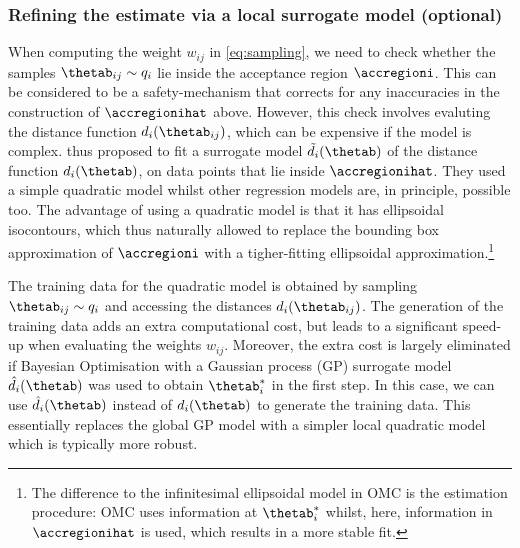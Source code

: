 \subsubsection*{Refining the estimate via a local surrogate model (optional)}
When computing the weight \(w_{ij}\) in \eqref{eq:sampling}, we need
to check whether the samples \(\thetab_{ij} \sim q_i\) lie inside the
acceptance region \(\accregioni\). This can be considered to be a
safety-mechanism that corrects for any inaccuracies in the
construction of \(\accregionihat\) above. However, this check involves
evaluting the distance function \(d_i(\thetab_{ij})\), which can be
expensive if the model is complex. \citet{Ikonomov2019} thus proposed
to fit a surrogate model \(\tilde{d}_i(\thetab)\) of the distance
function \(d_i(\thetab)\), on data points that lie inside
\(\accregionihat\). They used a simple quadratic model whilst other
regression models are, in principle, possible too. The advantage of
using a quadratic model is that it has ellipsoidal isocontours, which
thus naturally allowed \citet{Ikonomov2019} to replace the bounding
box approximation of \(\accregioni\) with a tigher-fitting ellipsoidal
approximation.\footnote{The difference to the infinitesimal
  ellipsoidal model in OMC is the estimation procedure: OMC uses
  information at \(\thetab_i^*\) whilst, here, information in
  \(\accregionihat\) is used, which results in a more stable fit.}

The training data for the quadratic model is obtained by sampling
\(\thetab_{ij} \sim q_i\) and accessing the distances
\(d_i(\thetab_{ij})\). The generation of the training data adds an
extra computational cost, but leads to a significant speed-up when
evaluating the weights \(w_{ij}\). Moreover, the extra cost is largely
eliminated if Bayesian Optimisation with a Gaussian process (GP)
surrogate model \(\hat{d}_i(\thetab)\) was used to obtain
\(\thetab_i^*\) in the first step. In this case, we can use
\(\hat{d}_i(\thetab)\) instead of \(d_i(\thetab)\) to generate the
training data. This essentially replaces the global GP model with a
simpler local quadratic model which is typically more robust.
